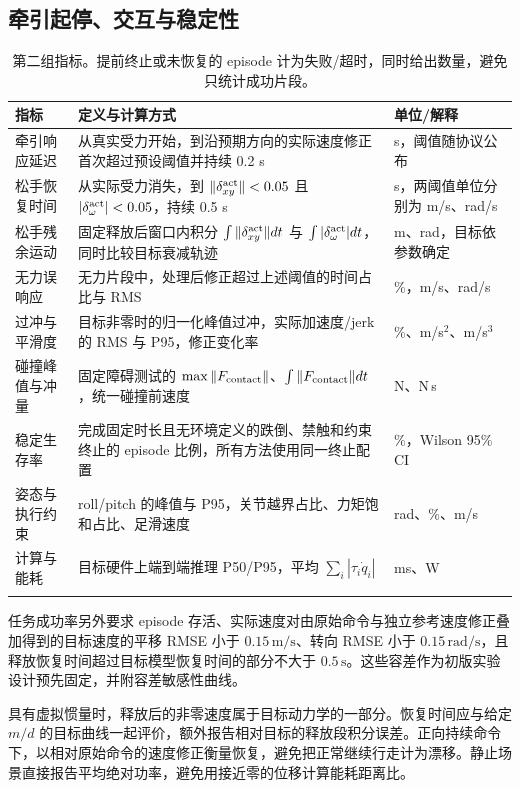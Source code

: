 \subsection{牵引起停、交互与稳定性}
\begin{longtable}{P{28mm}P{84mm}P{30mm}}
\toprule 指标 & 定义与计算方式 & 单位/解释\\\midrule\endhead
牵引响应延迟 & 从真实受力开始，到沿预期方向的实际速度修正首次超过预设阈值并持续 0.2 s & s，阈值随协议公布\\
松手恢复时间 & 从实际受力消失，到 $\|\delta^{\rm act}_{xy}\|<0.05$ 且 $|\delta^{\rm act}_{\omega}|<0.05$，持续 0.5 s & s，两阈值单位分别为 m/s、rad/s\\
松手残余运动 & 固定释放后窗口内积分 $\int\|\delta^{\rm act}_{xy}\|dt$ 与 $\int|\delta^{\rm act}_{\omega}|dt$，同时比较目标衰减轨迹 & m、rad，目标依参数确定\\
无力误响应 & 无力片段中，处理后修正超过上述阈值的时间占比与 RMS & \%，m/s、rad/s\\
过冲与平滑度 & 目标非零时的归一化峰值过冲，实际加速度/jerk 的 RMS 与 P95，修正变化率 & \%、m/s$^2$、m/s$^3$\\
碰撞峰值与冲量 & 固定障碍测试的 $\max\|F_{\rm contact}\|$、$\int\|F_{\rm contact}\|dt$，统一碰撞前速度 & N、N\,s\\
稳定生存率 & 完成固定时长且无环境定义的跌倒、禁触和约束终止的 episode 比例，所有方法使用同一终止配置 & \%，Wilson 95\% CI\\
姿态与执行约束 & roll/pitch 的峰值与 P95，关节越界占比、力矩饱和占比、足滑速度 & rad、\%、m/s\\
计算与能耗 & 目标硬件上端到端推理 P50/P95，平均 $\sum_i|\tau_i\dot q_i|$ & ms、W\\\bottomrule
\caption{第二组指标。提前终止或未恢复的 episode 计为失败/超时，同时给出数量，避免只统计成功片段。}
\end{longtable}

任务成功率另外要求 episode 存活、实际速度对由原始命令与独立参考速度修正叠加得到的目标速度的平移 RMSE 小于 $0.15\,\mathrm{m/s}$、转向 RMSE 小于 $0.15\,\mathrm{rad/s}$，且释放恢复时间超过目标模型恢复时间的部分不大于 $0.5\,\mathrm s$。这些容差作为初版实验设计预先固定，并附容差敏感性曲线。

具有虚拟惯量时，释放后的非零速度属于目标动力学的一部分。恢复时间应与给定 $m/d$ 的目标曲线一起评价，额外报告相对目标的释放段积分误差。正向持续命令下，以相对原始命令的速度修正衡量恢复，避免把正常继续行走计为漂移。静止场景直接报告平均绝对功率，避免用接近零的位移计算能耗距离比。

